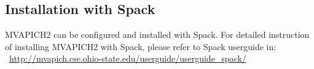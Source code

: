 \subsection{Installation with Spack}

MVAPICH2 can be configured and installed with Spack. For detailed instruction of
installing MVAPICH2 with Spack, please refer to Spack userguide in:\\
~\href{http://mvapich.cse.ohio-state.edu/userguide/userguide\_spack/}{http://mvapich.cse.ohio-state.edu/userguide/userguide\_spack/} 
